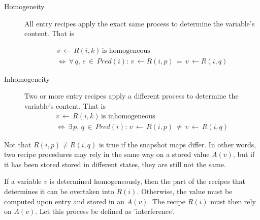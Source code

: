 \documentclass[12pt,a4paper]{scrartcl}
\theoremstyle{break}
\begin{document}
\begin{description}
    \item[Homogeneity] All entry recipes apply the exact same process to
                       determine the variable's content. That is

    \begin{equation}
        \begin{aligned}
        v\,\leftarrow\,R(i,k)\,\mbox{is homogeneous}\\
        \Leftrightarrow\,\forall\,q,\,e\,\in\,Pred(i):\,v\,\leftarrow R(i,p)\,=\,v\,\leftarrow R(i,q) 
        \end{aligned}
    \end{equation}

    \item[Inhomogeneity] Two or more entry recipes apply a different process
                         to determine the variable's content. That is
    \begin{equation}
        \begin{aligned}
        v\,\leftarrow\,R(i,k)\,\mbox{is inhomogeneous}\\
        \Leftrightarrow\,\exists\,p,\,q\,\in\,Pred(i):\,v\,\leftarrow\,R(i,p)\,\neq\,v\,\leftarrow\,R(i,q)
        \end{aligned}
    \end{equation}
\end{description}

Not that \(R(i,p) \neq R(i,q)\) is true if the snapshot maps differ. In other
words, two recipe procedures may rely in the same way on a stored value $A(v)$,
but if it has been stored stored in different states, they are still not
the same.

If a variable $v$ is determined homogeneously, then the part of the recipes
that determines it can be overtaken into $R(i)$. Otherwise, the value must be
computed upon entry and stored in an $A(v)$. The recipe $R(i)$ must then rely
on $A(v)$. Let this process be defined as 'interference'.
\end{document}
